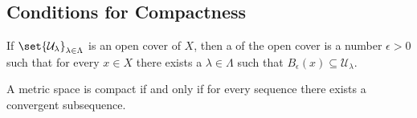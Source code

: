 \documentclass[10pt]{article}
\def\mU{\mathcal{U}}
\begin{document}


\bigskip

\subsection{Conditions for Compactness}

\begin{defn*}

    If $\set{\mU_\lambda}_{\lambda\in\Lambda}$ is an open cover of $X$, then a  of the open cover is a number $\epsilon>0$ such that for every $x\in X$ there exists a
    $\lambda\in\Lambda$ such that $B_\epsilon(x)\subseteq\mU_\lambda$.

\end{defn*}

\begin{thrm*}

    A metric space is compact if and only if for every sequence there exists a convergent subsequence.

\end{thrm*}
\end{document}
